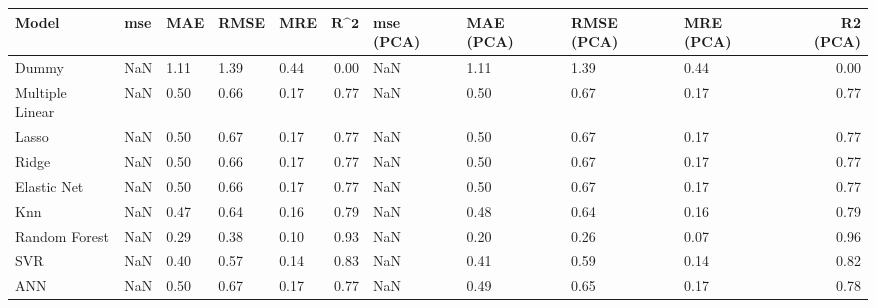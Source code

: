 \begin{table}
\centering
\label{table:iri_reg_pred}
\begin{tabular}{lllllrllllr}
\toprule
 \textbf{Model} & \textbf{mse} & \textbf{MAE} & \textbf{RMSE} & \textbf{MRE} & $\textbf{R^2}$ & \textbf{mse (PCA)} & \textbf{MAE (PCA)} & \textbf{RMSE (PCA)} & \textbf{MRE (PCA)} & \textbf{R2 (PCA)} \\
\midrule
          Dummy &          NaN &         1.11 &          1.39 &         0.44 &           0.00 &                NaN &               1.11 &                1.39 &               0.44 &              0.00 \\
Multiple Linear &          NaN &         0.50 &          0.66 &         0.17 &           0.77 &                NaN &               0.50 &                0.67 &               0.17 &              0.77 \\
          Lasso &          NaN &         0.50 &          0.67 &         0.17 &           0.77 &                NaN &               0.50 &                0.67 &               0.17 &              0.77 \\
          Ridge &          NaN &         0.50 &          0.66 &         0.17 &           0.77 &                NaN &               0.50 &                0.67 &               0.17 &              0.77 \\
    Elastic Net &          NaN &         0.50 &          0.66 &         0.17 &           0.77 &                NaN &               0.50 &                0.67 &               0.17 &              0.77 \\
            Knn &          NaN &         0.47 &          0.64 &         0.16 &           0.79 &                NaN &               0.48 &                0.64 &               0.16 &              0.79 \\
  Random Forest &          NaN &         0.29 &          0.38 &         0.10 &           0.93 &                NaN &               0.20 &                0.26 &               0.07 &              0.96 \\
            SVR &          NaN &         0.40 &          0.57 &         0.14 &           0.83 &                NaN &               0.41 &                0.59 &               0.14 &              0.82 \\
            ANN &          NaN &         0.50 &          0.67 &         0.17 &           0.77 &                NaN &               0.49 &                0.65 &               0.17 &              0.78 \\
\bottomrule
\end{tabular}
\end{table}
